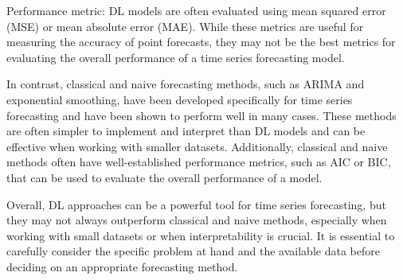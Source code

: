 Performance metric: DL models are often evaluated using mean squared error (MSE) or mean absolute error (MAE). While these metrics are useful for measuring the accuracy of point forecasts, they may not be the best metrics for evaluating the overall performance of a time series forecasting model.

In contrast, classical and naive forecasting methods, such as ARIMA and exponential smoothing, have been developed specifically for time series forecasting and have been shown to perform well in many cases. These methods are often simpler to implement and interpret than DL models and can be effective when working with smaller datasets. Additionally, classical and naive methods often have well-established performance metrics, such as AIC or BIC, that can be used to evaluate the overall performance of a model.

Overall, DL approaches can be a powerful tool for time series forecasting, but they may not always outperform classical and naive methods, especially when working with small datasets or when interpretability is crucial. It is essential to carefully consider the specific problem at hand and the available data before deciding on an appropriate forecasting method.